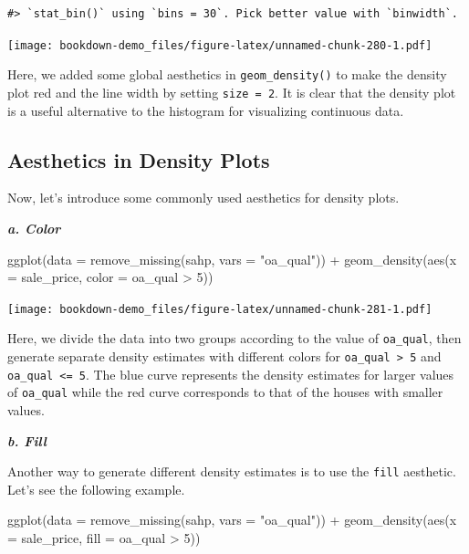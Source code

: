 \documentclass[
]{book}
\newenvironment{Shaded}{\begin{snugshade}}{\end{snugshade}}
\newcommand{\AttributeTok}[1]{\textcolor[rgb]{0.77,0.63,0.00}{#1}}
\newcommand{\DecValTok}[1]{\textcolor[rgb]{0.00,0.00,0.81}{#1}}
\newcommand{\FunctionTok}[1]{\textcolor[rgb]{0.00,0.00,0.00}{#1}}
\newcommand{\NormalTok}[1]{#1}
\newcommand{\SpecialCharTok}[1]{\textcolor[rgb]{0.00,0.00,0.00}{#1}}
\newcommand{\StringTok}[1]{\textcolor[rgb]{0.31,0.60,0.02}{#1}}
\begin{document}
\begin{verbatim}
#> `stat_bin()` using `bins = 30`. Pick better value with `binwidth`.
\end{verbatim}

\texttt{[image: bookdown-demo\_files/figure-latex/unnamed-chunk-280-1.pdf]}

Here, we added some global aesthetics in \texttt{geom\_density()} to make the density plot red and the line width by setting \texttt{size\ =\ 2}. It is clear that the density plot is a useful alternative to the histogram for visualizing continuous data.

\hypertarget{aesthetics-in-density-plots}{%
\subsection{Aesthetics in Density Plots}\label{aesthetics-in-density-plots}}

Now, let's introduce some commonly used aesthetics for density plots.

\textbf{\emph{a. Color}}

\begin{Shaded}
\begin{Highlighting}[]
\FunctionTok{ggplot}\NormalTok{(}\AttributeTok{data =} \FunctionTok{remove\_missing}\NormalTok{(sahp, }\AttributeTok{vars =} \StringTok{"oa\_qual"}\NormalTok{)) }\SpecialCharTok{+}  \FunctionTok{geom\_density}\NormalTok{(}\FunctionTok{aes}\NormalTok{(}\AttributeTok{x =}\NormalTok{ sale\_price, }\AttributeTok{color =}\NormalTok{ oa\_qual }\SpecialCharTok{\textgreater{}} \DecValTok{5}\NormalTok{))}
\end{Highlighting}
\end{Shaded}

\texttt{[image: bookdown-demo\_files/figure-latex/unnamed-chunk-281-1.pdf]}

Here, we divide the data into two groups according to the value of \texttt{oa\_qual}, then generate separate density estimates with different colors for \texttt{oa\_qual\ \textgreater{}\ 5} and \texttt{oa\_qual\ \textless{}=\ 5}. The blue curve represents the density estimates for larger values of \texttt{oa\_qual} while the red curve corresponds to that of the houses with smaller values.

\textbf{\emph{b. Fill}}

Another way to generate different density estimates is to use the \texttt{fill} aesthetic. Let's see the following example.

\begin{Shaded}
\begin{Highlighting}[]
\FunctionTok{ggplot}\NormalTok{(}\AttributeTok{data =} \FunctionTok{remove\_missing}\NormalTok{(sahp, }\AttributeTok{vars =} \StringTok{"oa\_qual"}\NormalTok{)) }\SpecialCharTok{+}  \FunctionTok{geom\_density}\NormalTok{(}\FunctionTok{aes}\NormalTok{(}\AttributeTok{x =}\NormalTok{ sale\_price, }\AttributeTok{fill =}\NormalTok{ oa\_qual }\SpecialCharTok{\textgreater{}} \DecValTok{5}\NormalTok{))}
\end{Highlighting}
\end{Shaded}
\end{document}
